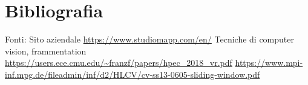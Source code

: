 \section{Bibliografia}
Fonti:
Sito aziendale
\url{https://www.studiomapp.com/en/}
Tecniche di computer vision, frammentation
\url{https://users.ece.cmu.edu/~franzf/papers/hpec_2018_vr.pdf}
\url{https://www.mpi-inf.mpg.de/fileadmin/inf/d2/HLCV/cv-ss13-0605-sliding-window.pdf}